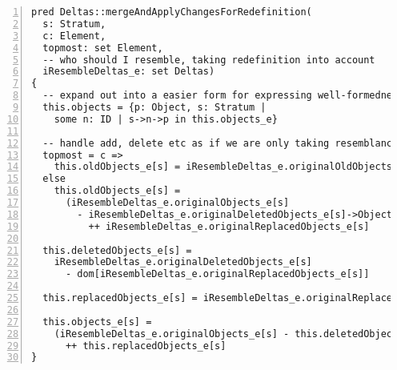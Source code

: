 \begin{lstlisting}[caption={deltas.als}, numbers=left]
pred Deltas::mergeAndApplyChangesForRedefinition(
  s: Stratum,
  c: Element,
  topmost: set Element,
  -- who should I resemble, taking redefinition into account
  iResembleDeltas_e: set Deltas)
{
  -- expand out into a easier form for expressing well-formedness rule, where IDs don't count
  this.objects = {p: Object, s: Stratum |
    some n: ID | s->n->p in this.objects_e}

  -- handle add, delete etc as if we are only taking resemblance into account
  topmost = c =>
    this.oldObjects_e[s] = iResembleDeltas_e.originalOldObjects_e[s]
  else
    this.oldObjects_e[s] =
      (iResembleDeltas_e.originalObjects_e[s]
        - iResembleDeltas_e.originalDeletedObjects_e[s]->Object)
          ++ iResembleDeltas_e.originalReplacedObjects_e[s]

  this.deletedObjects_e[s] =
    iResembleDeltas_e.originalDeletedObjects_e[s]
      - dom[iResembleDeltas_e.originalReplacedObjects_e[s]]
    
  this.replacedObjects_e[s] = iResembleDeltas_e.originalReplacedObjects_e[s]
      
  this.objects_e[s] = 
    (iResembleDeltas_e.originalObjects_e[s] - this.deletedObjects_e[s]->Object)
      ++ this.replacedObjects_e[s]
}

\end{lstlisting}